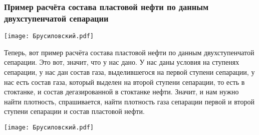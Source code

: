 \documentclass[main.tex]{subfiles}
\begin{document}
\subsubsection{Пример расчёта состава пластовой нефти по данным двухступенчатой сепарации}

\begin{center}
\texttt{[image: Брусиловский.pdf]}
\end{center}

Теперь, вот пример расчёта состава пластовой нефти по данным двухступенчатой сепарации.
Это вот, значит, что у нас дано.
У нас даны условия на ступенях сепарации, у нас дан состав газа, выделившегося на первой ступени сепарации, у нас есть состав газа, который выделен на второй ступени сепарации, то есть в стоктанке, и состав дегазированной в стоктанке нефти.
Значит, и нам нужно найти плотность, спрашивается, найти плотность газа сепарации первой и второй ступени сепарации и состав пластовой нефти.

\begin{center}
\texttt{[image: Брусиловский.pdf]}
\end{center}
\end{document}
